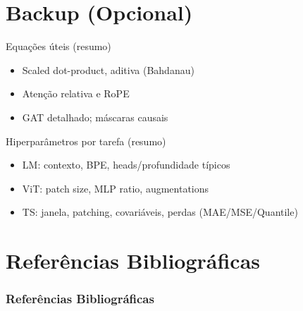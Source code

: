 \documentclass{beamer}
\begin{document}
\section{Backup (Opcional)}
\begin{frame}{Equações úteis (resumo)}
	\small
	\begin{itemize}
		\item Scaled dot-product, aditiva (Bahdanau)
		\item Atenção relativa e RoPE
		\item GAT detalhado; máscaras causais
	\end{itemize}
\end{frame}

\begin{frame}{Hiperparâmetros por tarefa (resumo)}
	\small
	\begin{itemize}
		\item LM: contexto, BPE, heads/profundidade típicos
		\item ViT: patch size, MLP ratio, augmentations
		\item TS: janela, patching, covariáveis, perdas (MAE/MSE/Quantile)
	\end{itemize}
\end{frame}

\section{Referências Bibliográficas}
\begin{frame}[allowframebreaks]
	\frametitle{Referências Bibliográficas}
	
	
\end{frame}
\end{document}
